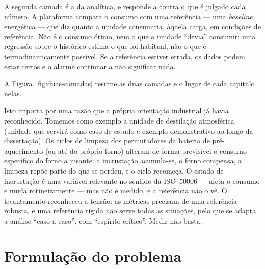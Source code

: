 A segunda camada é a da analítica, e responde a contra o que é julgado
cada número. A plataforma compara o consumo com uma referência --- uma
\emph{baseline} energética --- que diz quanto a unidade consumiria,
àquela carga, em condições de referência. Não é o consumo ótimo, nem o
que a unidade \enquote{devia} consumir: uma regressão sobre o histórico
estima o que foi habitual, não o que é termodinamicamente possível. Se a
referência estiver errada, os dados podem estar certos e o alarme
continuar a não significar nada.


A Figura~\ref{fig:duas-camadas} resume as duas camadas e o lugar de cada capítulo nelas.



Isto importa por uma razão que a própria orientação industrial
já havia reconhecido. Tomemos como exemplo a unidade de destilação atmosférica (unidade que servirá como caso de estudo e exemplo demonstrativo ao longo da dissertação). Os ciclos de limpeza dos permutadores da bateria de
pré-aquecimento (ou até do próprio forno) alteram de forma previsível o consumo específico do forno
a jusante: a incrustação acumula-se, o forno compensa, a limpeza repõe
parte do que se perdeu, e o ciclo recomeça. O estado de incrustação é uma
variável relevante no sentido da ISO~50006 --- afeta o consumo e muda
rotineiramente --- mas não é medido, e a referência não o vê. O
levantamento reconheceu a tensão: as métricas precisam de uma referência
robusta, e uma referência rígida não serve todas as situações, pelo que
se adapta a análise \enquote{caso a caso}, com \enquote{espírito
crítico}.  Medir não basta.

\section{Formulação do problema}
\label{sec:problema}


